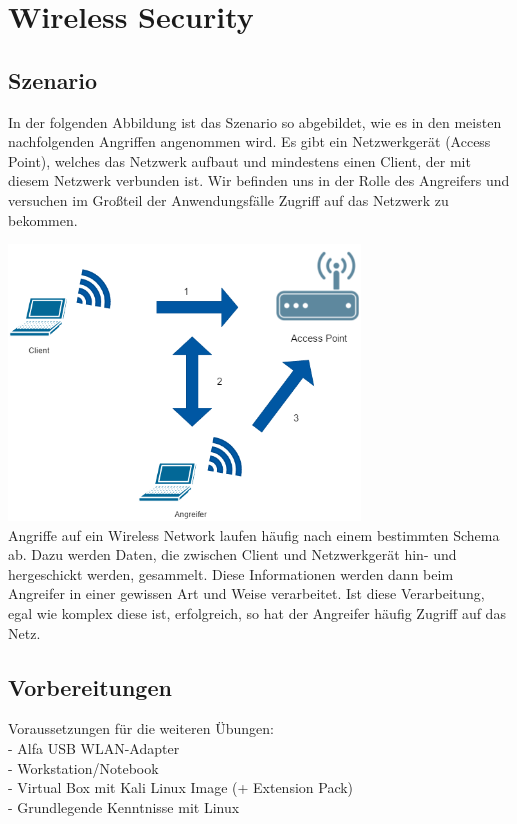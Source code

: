 \chapter{Wireless Security}

\section{Szenario}

In der folgenden Abbildung ist das Szenario so abgebildet, wie es in den meisten nachfolgenden Angriffen angenommen wird. Es gibt ein Netzwerkgerät (Access Point), welches das Netzwerk aufbaut und mindestens einen Client, der mit diesem Netzwerk verbunden ist. Wir befinden uns in der Rolle des Angreifers und versuchen im Großteil der Anwendungsfälle Zugriff auf das Netzwerk zu bekommen.

\includegraphics[width=0.7\textwidth]{bilder/wlan/WLANSzenario.png}\\

Angriffe auf ein Wireless Network laufen häufig nach einem bestimmten Schema ab. 
Dazu werden Daten, die zwischen Client und Netzwerkgerät hin- und hergeschickt werden, gesammelt. Diese Informationen werden dann beim Angreifer in einer gewissen Art und Weise verarbeitet.
Ist diese Verarbeitung, egal wie komplex diese ist, erfolgreich, so hat der Angreifer häufig Zugriff auf das Netz. 

\section{Vorbereitungen}

Voraussetzungen für die weiteren Übungen:\\

- Alfa USB WLAN-Adapter\\
- Workstation/Notebook\\
- Virtual Box mit Kali Linux Image (+ Extension Pack)\\
- Grundlegende Kenntnisse mit Linux\\

